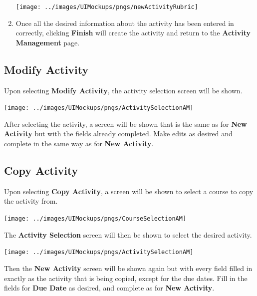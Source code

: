 \documentclass{article}
\begin{document}
\begin{enumerate}
\begin{center}
\texttt{[image: ../images/UIMockups/pngs/newActivityRubric]}
 \end{center}
 \item Once all the desired information about the activity has been entered
   in correctly, clicking \textbf{Finish} will create the activity and return 
   to the \textbf{Activity Management} page.
\end{enumerate}

\subsection{Modify Activity}
Upon selecting \textbf{Modify Activity}, the activity selection screen will be shown.
  \begin{center} 
     \texttt{[image: ../images/UIMockups/pngs/ActivitySelectionAM]}
     \label{actSel}
  \end{center} 
  After selecting the activity, a screen will be shown that is the same as for 
  \textbf{New Activity} but with the fields already completed. Make edits as
  desired and complete in the same way as for \textbf{New Activity}.

\subsection{Copy Activity}
Upon selecting \textbf{Copy Activity}, a screen will be shown to select a
course to copy the activity from.
\begin{center} 
   \texttt{[image: ../images/UIMockups/pngs/CourseSelectionAM]}
\end{center}
The \textbf{Activity Selection} screen will then be shown to select the desired activity.
\begin{center} 
   \texttt{[image: ../images/UIMockups/pngs/ActivitySelectionAM]}
\end{center}
Then the \textbf{New Activity} screen will be shown again but with every
field filled in exactly as the activity that is being copied, except for
the due dates. Fill in the fields 
for \textbf{Due Date} as desired, and complete as for \textbf{New Activity}.
\end{document}

